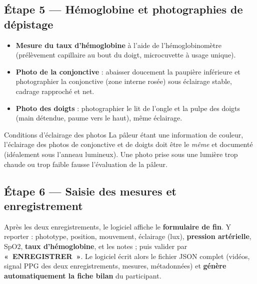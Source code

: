 \documentclass[11pt,a4paper]{article}
\begin{document}
\subsection{Étape 5 --- Hémoglobine et photographies de dépistage}
\begin{itemize}
\item \textbf{Mesure du taux d'hémoglobine} à l'aide de l'hémoglobinomètre
(prélèvement capillaire au bout du doigt, microcuvette à usage unique).
\item \textbf{Photo de la conjonctive} : abaisser doucement la paupière
inférieure et photographier la conjonctive (zone interne rosée) sous éclairage
stable, cadrage rapproché et net.
\item \textbf{Photo des doigts} : photographier le lit de l'ongle et la pulpe des
doigts (main détendue, paume vers le haut), même éclairage.
\end{itemize}

\begin{notebox}{Conditions d'éclairage des photos}
La pâleur étant une information de couleur, l'éclairage des photos de conjonctive
et de doigts doit être le \emph{même} et documenté (idéalement sous l'anneau
lumineux). Une photo prise sous une lumière trop chaude ou trop faible fausse
l'évaluation de la pâleur.
\end{notebox}

\subsection{Étape 6 --- Saisie des mesures et enregistrement}
Après les deux enregistrements, le logiciel affiche le \textbf{formulaire de fin}.
Y reporter : phototype, position, mouvement, éclairage (lux), \textbf{pression
artérielle}, SpO2, \textbf{taux d'hémoglobine}, et les notes ; puis valider par
\textbf{«~ENREGISTRER~»}. Le logiciel écrit alors le fichier JSON complet (vidéos,
signal PPG des deux enregistrements, mesures, métadonnées) et \textbf{génère
automatiquement la fiche bilan} du participant.
\end{document}
